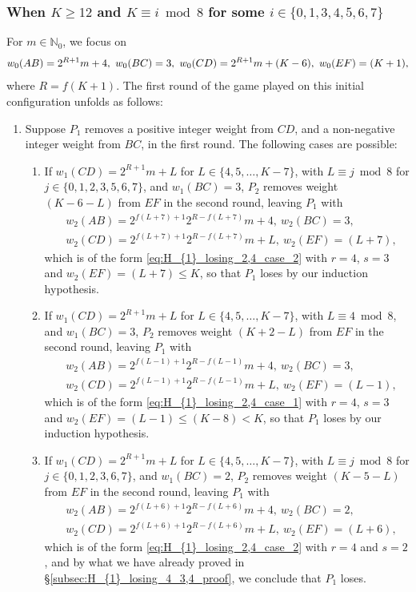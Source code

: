 \documentclass[11pt,reqno]{amsart}
\theoremstyle{definition}
\theoremstyle{definition}
\begin{document}
\subsubsection{When $K\geqslant 12$ and $K \equiv i \bmod 8$ for some $i \in \{0,1,3,4,5,6,7\}$} For $m \in \mathbb{N}_{0}$, we focus on
\begin{equation}
w_{0}(AB)=2^{R+1}m+4,\ w_{0}(BC)=3,\ w_{0}(CD)=2^{R+1}m+(K-6),\ w_{0}(EF)=(K+1),\label{eq:H_{1}_losing_4_5_inductive}
\end{equation}
where $R=f(K+1)$. The first round of the game played on this initial configuration unfolds as follows:
\begin{enumerate}
\item Suppose $P_{1}$ removes a positive integer weight from $CD$, and a non-negative integer weight from $BC$, in the first round. The following cases are possible:
\begin{enumerate}
\item If $w_{1}(CD)=2^{R+1}m+L$ for $L \in \{4,5,\ldots,K-7\}$, with $L \equiv j \bmod 8$ for $j \in \{0,1,2,3,5,6,7\}$, and $w_{1}(BC)=3$, $P_{2}$ removes weight $(K-6-L)$ from $EF$ in the second round, leaving $P_{1}$ with 
\begin{align}
{}&w_{2}(AB)=2^{f(L+7)+1}2^{R-f(L+7)}m+4,\ w_{2}(BC)=3,\nonumber\\
{}&w_{2}(CD)=2^{f(L+7)+1}2^{R-f(L+7)}m+L,\ w_{2}(EF)=(L+7),\nonumber
\end{align}
which is of the form \eqref{eq:H_{1}_losing_2,4_case_2} with $r=4$, $s=3$ and $w_{2}(EF)=(L+7) \leqslant K$, so that $P_{1}$ loses by our induction hypothesis. 

\item If $w_{1}(CD)=2^{R+1}m+L$ for $L \in \{4,5,\ldots,K-7\}$, with $L \equiv 4 \bmod 8$, and $w_{1}(BC)=3$, $P_{2}$ removes weight $(K+2-L)$ from $EF$ in the second round, leaving $P_{1}$ with
\begin{align}
{}&w_{2}(AB)=2^{f(L-1)+1}2^{R-f(L-1)}m+4,\ w_{2}(BC)=3,\nonumber\\
{}&w_{2}(CD)=2^{f(L-1)+1}2^{R-f(L-1)}m+L,\ w_{2}(EF)=(L-1),\nonumber
\end{align}
which is of the form \eqref{eq:H_{1}_losing_2,4_case_1} with $r=4$, $s=3$ and $w_{2}(EF)=(L-1)\leqslant (K-8)<K$, so that $P_{1}$ loses by our induction hypothesis.

\item If $w_{1}(CD)=2^{R+1}m+L$ for $L \in \{4,5,\ldots,K-7\}$, with $L \equiv j \bmod 8$ for $j \in \{0,1,2,3,6,7\}$, and $w_{1}(BC)=2$, $P_{2}$ removes weight $(K-5-L)$ from $EF$ in the second round, leaving $P_{1}$ with
\begin{align}
{}&w_{2}(AB)=2^{f(L+6)+1}2^{R-f(L+6)}m+4,\ w_{2}(BC)=2,\nonumber\\
{}&w_{2}(CD)=2^{f(L+6)+1}2^{R-f(L+6)}m+L,\ w_{2}(EF)=(L+6),\nonumber
\end{align}
which is of the form \eqref{eq:H_{1}_losing_2,4_case_2} with $r=4$ and $s=2$, and by what we have already proved in \S\ref{subsec:H_{1}_losing_4_3,4_proof}, we conclude that $P_{1}$ loses.


\end{enumerate}
\end{enumerate}
\end{document}
